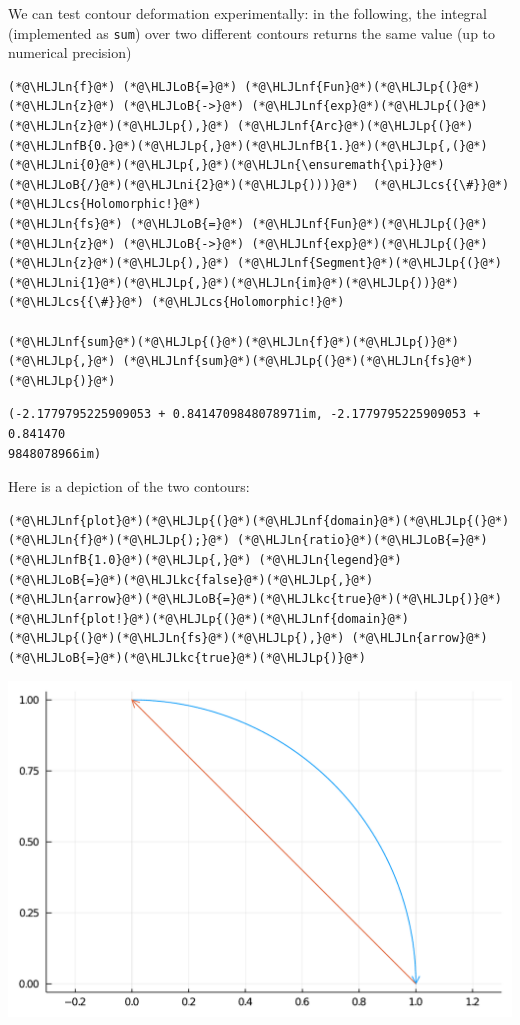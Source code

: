 \documentclass[12pt,a4paper]{article}
\newcommand{\HLJLkc}[1]{\textcolor[RGB]{59,151,46}{\textit{#1}}}
\newcommand{\HLJLn}[1]{#1}
\newcommand{\HLJLnf}[1]{\textcolor[RGB]{66,102,213}{#1}}
\newcommand{\HLJLnfB}[1]{\textcolor[RGB]{59,151,46}{#1}}
\newcommand{\HLJLni}[1]{\textcolor[RGB]{59,151,46}{#1}}
\newcommand{\HLJLoB}[1]{\textcolor[RGB]{102,102,102}{\textbf{#1}}}
\newcommand{\HLJLp}[1]{#1}
\newcommand{\HLJLcs}[1]{\textcolor[RGB]{153,153,119}{\textit{#1}}}
\begin{document}
We can test contour deformation experimentally: in the following, the integral (implemented as \texttt{sum}) over two different contours returns the same value (up to numerical precision)


\begin{lstlisting}
(*@\HLJLn{f}@*) (*@\HLJLoB{=}@*) (*@\HLJLnf{Fun}@*)(*@\HLJLp{(}@*) (*@\HLJLn{z}@*) (*@\HLJLoB{->}@*) (*@\HLJLnf{exp}@*)(*@\HLJLp{(}@*)(*@\HLJLn{z}@*)(*@\HLJLp{),}@*) (*@\HLJLnf{Arc}@*)(*@\HLJLp{(}@*)(*@\HLJLnfB{0.}@*)(*@\HLJLp{,}@*)(*@\HLJLnfB{1.}@*)(*@\HLJLp{,(}@*)(*@\HLJLni{0}@*)(*@\HLJLp{,}@*)(*@\HLJLn{\ensuremath{\pi}}@*)(*@\HLJLoB{/}@*)(*@\HLJLni{2}@*)(*@\HLJLp{)))}@*)  (*@\HLJLcs{{\#}}@*) (*@\HLJLcs{Holomorphic!}@*)
(*@\HLJLn{fs}@*) (*@\HLJLoB{=}@*) (*@\HLJLnf{Fun}@*)(*@\HLJLp{(}@*) (*@\HLJLn{z}@*) (*@\HLJLoB{->}@*) (*@\HLJLnf{exp}@*)(*@\HLJLp{(}@*)(*@\HLJLn{z}@*)(*@\HLJLp{),}@*) (*@\HLJLnf{Segment}@*)(*@\HLJLp{(}@*)(*@\HLJLni{1}@*)(*@\HLJLp{,}@*)(*@\HLJLn{im}@*)(*@\HLJLp{))}@*)  (*@\HLJLcs{{\#}}@*) (*@\HLJLcs{Holomorphic!}@*)

(*@\HLJLnf{sum}@*)(*@\HLJLp{(}@*)(*@\HLJLn{f}@*)(*@\HLJLp{)}@*)  (*@\HLJLp{,}@*) (*@\HLJLnf{sum}@*)(*@\HLJLp{(}@*)(*@\HLJLn{fs}@*)(*@\HLJLp{)}@*)
\end{lstlisting}

\begin{lstlisting}
(-2.1779795225909053 + 0.8414709848078971im, -2.1779795225909053 + 0.841470
9848078966im)
\end{lstlisting}


Here is a depiction of the two contours:


\begin{lstlisting}
(*@\HLJLnf{plot}@*)(*@\HLJLp{(}@*)(*@\HLJLnf{domain}@*)(*@\HLJLp{(}@*)(*@\HLJLn{f}@*)(*@\HLJLp{);}@*) (*@\HLJLn{ratio}@*)(*@\HLJLoB{=}@*)(*@\HLJLnfB{1.0}@*)(*@\HLJLp{,}@*) (*@\HLJLn{legend}@*)(*@\HLJLoB{=}@*)(*@\HLJLkc{false}@*)(*@\HLJLp{,}@*) (*@\HLJLn{arrow}@*)(*@\HLJLoB{=}@*)(*@\HLJLkc{true}@*)(*@\HLJLp{)}@*)
(*@\HLJLnf{plot!}@*)(*@\HLJLp{(}@*)(*@\HLJLnf{domain}@*)(*@\HLJLp{(}@*)(*@\HLJLn{fs}@*)(*@\HLJLp{),}@*) (*@\HLJLn{arrow}@*)(*@\HLJLoB{=}@*)(*@\HLJLkc{true}@*)(*@\HLJLp{)}@*)
\end{lstlisting}

\includegraphics[width=\linewidth]{jl_z7eR69/Lecture1_30_1.pdf}
\end{document}
